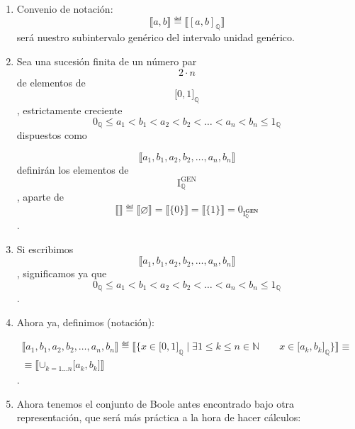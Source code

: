 \documentclass[
]{article}
\begin{document}
\begin{enumerate}
\begin{enumerate}
\begin{enumerate}
      \[\begin{array}{l}
      {\forall{⟦A⟧},{{⟦B⟧} \in \mathbf{\mathrm{I}}_{\mathbb{Q}}^{\mathbf{GEN}}}\mspace{72mu}{{⟦A⟧} + {⟦B⟧}}≝{⟦{A \cup B}⟧}} \\
      {\forall{⟦A⟧},{{⟦B⟧} \in \mathbf{\mathrm{I}}_{\mathbb{Q}}^{\mathbf{GEN}}}\mspace{72mu}{{⟦A⟧} \cdot {⟦B⟧}}≝{⟦{A \cap B}⟧}} \\
      {\forall{{⟦A⟧} \in \mathbf{\mathrm{I}}_{\mathbb{Q}}^{\mathbf{GEN}}}\mspace{252mu}\overline{⟦A⟧}≝{⟦{\mathbf{\mathrm{I}}_{\mathbb{Q}} \smallsetminus A}⟧}}
      \end{array}\]
    \item
      Convenio de
      notación:\[{⟦{a,b}⟧} ≝ {⟦\left\lbrack {a,b} \right\rbrack_{\mathbb{Q}}⟧}\]será
      nuestro subintervalo genérico del intervalo unidad genéri\-co.
    \item
      Sea una sucesión finita de un número par \[2 \cdot n\] de
      elementos de \[\lbrack 0,1\rbrack_{\mathbb{Q}}\], estricta\-mente
      creciente
      \[{{{{{{{0_{\mathbb{Q}} \leq a_{1}} < b_{1}} < a_{2}} < b_{2}} < \ldots} < a_{n}} < b_{n}} \leq 1_{\mathbb{Q}}\]
      dispuestos como

      \[⟦{a_{1},b_{1},a_{2},b_{2},\ldots,a_{n},b_{n}}⟧\]definirán los
      elementos de
      \[\mathbf{\mathrm{I}}_{\mathbb{Q}}^{\mathbf{\mathrm{GEN}}}\],
      aparte de
      \[{⟦⟧}≝{{⟦\varnothing ⟧} = {⟦{\{ 0\}}⟧} = {⟦{\{ 1\}}⟧} = 0_{\mathbf{\mathrm{I}}_{\mathbb{Q}}^{\mathbf{GEN}}}}\].
    \item
      Si escribimos \[⟦{a_{1},b_{1},a_{2},b_{2},\ldots,a_{n},b_{n}}⟧\],
      significamos ya que
      \[{{{{{{{0_{\mathbb{Q}} \leq a_{1}} < b_{1}} < a_{2}} < b_{2}} < \ldots} < a_{n}} < b_{n}} \leq 1_{\mathbb{Q}}\].
    \item
      Ahora ya, definimos (notación):

      \[\begin{array}{l}
      {{⟦{a_{1},b_{1},a_{2},b_{2},\ldots,a_{n},b_{n}}⟧}≝{{⟦{\{{{x \in {\lbrack 0,1\rbrack}_{\mathbb{Q}}} \mid \exists{1 \leq k \leq n \in {\mathbb{N}}}\qquad{x \in {\lbrack{a_{k},b_{k}}\rbrack}_{\mathbb{Q}}}}\}}⟧} \equiv}} \\
      {\equiv {⟦{\mathbf{\mathrm{\cup}}_{{k = 1.}..n}{\lbrack{a_{k},b_{k}}\rbrack}}⟧}}
      \end{array}\].
    \item
      Ahora tenemos el conjunto de Boole antes encontrado bajo otra
      representación, que será más práctica a la hora de hacer cálculos:


\end{enumerate}
\end{enumerate}
\end{enumerate}
\end{document}
